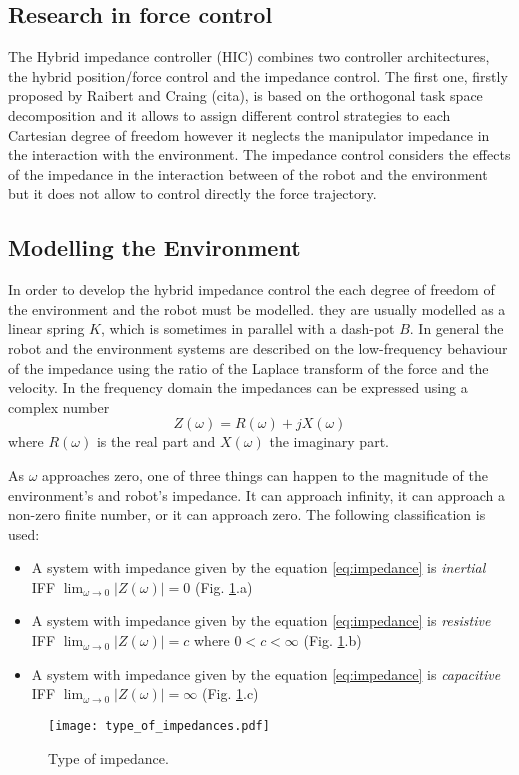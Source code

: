 \subsection{Research in force control}
The Hybrid impedance controller (HIC) combines two controller 
architectures, the hybrid position/force control and the impedance control.
The first one, firstly proposed by Raibert and Craing (cita), 
is based on the orthogonal task space decomposition and it 
allows to assign different control strategies to each 
Cartesian degree of freedom however it neglects the 
manipulator impedance in the interaction with the environment.
The impedance control considers the effects of the 
impedance in the interaction between of the robot and the 
environment but it does not allow to control directly the force trajectory.

\subsection{Modelling the Environment}
In order to develop the hybrid impedance control the each 
degree of freedom of the environment and the robot must 
be modelled. they are usually modelled as a linear spring $K$, 
which is sometimes in parallel with a dash-pot $B$. In general 
the robot and the environment systems are described on the 
low-frequency behaviour of the impedance using the ratio of the 
Laplace transform of the force and the velocity.
In the frequency domain the impedances can be expressed using a complex number
\begin{equation}
  \label{eq:impedance}
  Z(\omega)=R(\omega)+jX(\omega)
\end{equation}
where $R(\omega)$ is the real part and $X(\omega)$ the imaginary part.

As $\omega$ approaches zero, one of three things can happen to 
the magnitude of the environment's and robot's impedance. It can 
approach infinity, it can approach a non-zero finite number, 
or it can approach zero. 
The following classification is used:
\begin{itemize}
\item A system with impedance given by the equation \ref{eq:impedance} is \emph{inertial} IFF $\lim_{\omega \to 0}|Z(\omega)| = 0$ (Fig. \ref{fig:type_of_impedances}.a)
\item A system with impedance given by the equation \ref{eq:impedance} is \emph{resistive} IFF $\lim_{\omega \to 0}|Z(\omega)| = c$ where $0<c<\infty$ (Fig. \ref{fig:type_of_impedances}.b)
\item A system with impedance given by the equation \ref{eq:impedance} is \emph{capacitive} IFF $\lim_{\omega \to 0}|Z(\omega)| = \infty$ (Fig. \ref{fig:type_of_impedances}.c)
\end{itemize}
\begin{figure}[h]
  \centering
  \texttt{[image: type\_of\_impedances.pdf]}
  \caption{Type of impedance. \label{fig:type_of_impedances}}
\end{figure}

